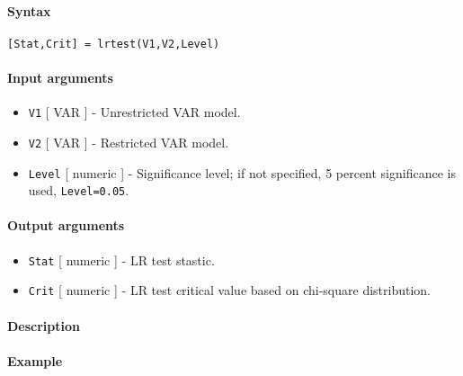


	\paragraph{Syntax}\label{syntax}

\begin{verbatim}
[Stat,Crit] = lrtest(V1,V2,Level)
\end{verbatim}

\paragraph{Input arguments}\label{input-arguments}

\begin{itemize}
\item
  \texttt{V1} {[} VAR {]} - Unrestricted VAR model.
\item
  \texttt{V2} {[} VAR {]} - Restricted VAR model.
\item
  \texttt{Level} {[} numeric {]} - Significance level; if not specified,
  5 percent significance is used, \texttt{Level=0.05}.
\end{itemize}

\paragraph{Output arguments}\label{output-arguments}

\begin{itemize}
\item
  \texttt{Stat} {[} numeric {]} - LR test stastic.
\item
  \texttt{Crit} {[} numeric {]} - LR test critical value based on
  chi-square distribution.
\end{itemize}

\paragraph{Description}\label{description}

\paragraph{Example}\label{example}


